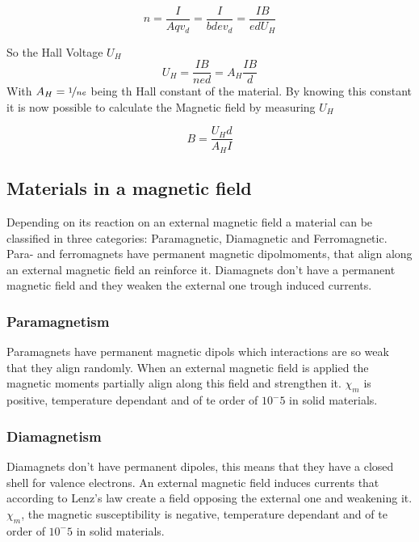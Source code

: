 \documentclass[12pt]{article}
\begin{document}
	\begin{equation}
		n=\frac{I}{Aqv_d}=\frac{I}{bdev_d}=\frac{IB}{edU_H}
	\end{equation}
	
	So the Hall Voltage $U_H$
	\begin{equation}
		U_H=\frac{IB}{ned}=A_H\frac{IB}{d}
	\end{equation}
	With $A_H=\nicefrac{1}{ne}$ being th Hall constant of the material. By knowing this constant it is now possible to calculate the Magnetic field by measuring $U_H  $
	
	\begin{equation}
		B= \frac{U_H d}{A_H I}
	\end{equation}

	\subsection{Materials in a magnetic field}
	Depending on its reaction on an external magnetic field a material can be classified in three categories: Paramagnetic, Diamagnetic and Ferromagnetic. Para- and ferromagnets have permanent magnetic dipolmoments, that align along an external magnetic field an reinforce it. Diamagnets don't have a permanent magnetic field and they weaken the external one trough induced currents.
		\subsubsection{Paramagnetism}
		Paramagnets have permanent magnetic dipols which interactions are so weak that they align randomly. When an external magnetic field is applied the magnetic moments partially align along this field and strengthen it. $\chi_m$ is positive, temperature dependant and of te order of $10^-5$ in solid materials.
		
		\subsubsection{Diamagnetism}
		Diamagnets don't have permanent dipoles, this means that they have a closed shell for valence electrons. An external magnetic field induces currents that according to Lenz's law create a field opposing the external one and weakening it. $\chi_m$, the magnetic susceptibility is negative, temperature dependant and of te order of $10^-5$ in solid materials.
		
\end{document}

